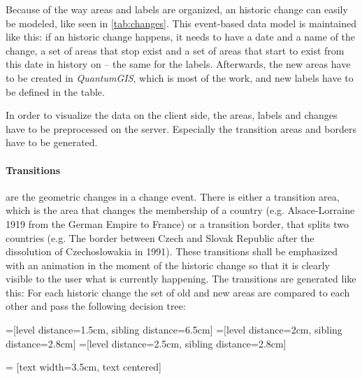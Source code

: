 Because of the way areas and labels are organized, an historic change can easily be modeled, like seen in \ref{tab:changes}. This event-based data model is maintained like this: if an historic change happens, it needs to have a date and a name of the change, a set of areas that stop exist and a set of areas that start to exist from this date in history on -- the same for the labels. Afterwards, the new areas have to be created in \textit{QuantumGIS}, which is most of the work, and new labels have to be defined in the table.

In order to visualize the data on the client side, the areas, labels and changes have to be preprocessed on the server. Especially the transition areas and borders have to be generated.

\newpage
\paragraph{Transitions} are the geometric changes in a change event. There is either a transition area, which is the area that changes the membership of a country (e.g. Alsace-Lorraine 1919 from the German Empire to France) or a transition border, that splits two countries (e.g. The border between Czech and Slovak Republic after the dissolution of Czechoslowakia in 1991). These transitions shall be emphasized with an animation in the moment of the historic change so that it is clearly visible to the user what is currently happening. The transitions are generated like this: For each historic change the set of old and new areas are compared to each other and pass the following decision tree:

=[level distance=1.5cm, sibling distance=6.5cm]
=[level distance=2cm, sibling distance=2.8cm]
=[level distance=2.5cm, sibling distance=2.8cm]

 = [text width=3.5cm, text centered]


